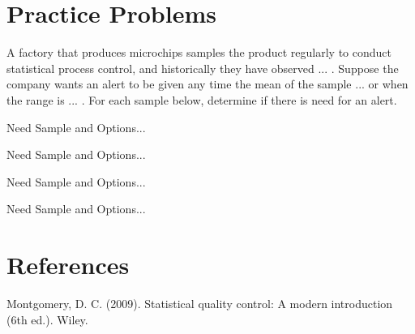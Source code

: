 \documentclass{ximera}
\begin{document}
\section*{Practice Problems}

A factory that produces microchips samples the product regularly to conduct statistical process control, and historically they have observed ... .  Suppose the company wants an alert to be given any time the mean of the sample ... or when the range is ... .  For each sample below, determine if there is need for an alert.

\begin{problem}
Need Sample and Options...
\end{problem}

\begin{problem}
Need Sample and Options...
\end{problem}

\begin{problem}
Need Sample and Options...
\end{problem}

\begin{problem}
Need Sample and Options...
\end{problem}

\section*{References}

Montgomery, D. C. (2009). Statistical quality control: A modern introduction (6th ed.). Wiley.
\end{document}
